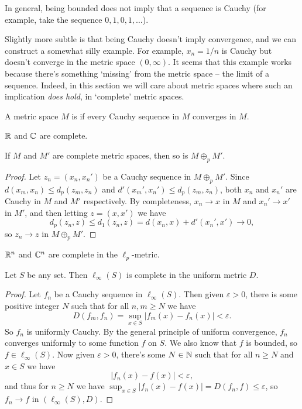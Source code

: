 \documentclass[a4paper]{scrartcl}
\begin{document}
In general, being bounded does not imply that a sequence is Cauchy (for example, take the sequence $0, 1, 0, 1, \dots$).

Slightly more subtle is that being Cauchy doesn't imply convergence, and we can construct a somewhat silly example. For example, $x_n = 1/n$ is Cauchy but doesn't converge in the metric space $(0, \infty)$.
It seems that this example works because there's something `missing' from the metric space -- the limit of a sequence. Indeed, in this section we will care about metric spaces where such an implication \emph{does hold}, in `complete' metric spaces.

\begin{definition}[Completeness]
    A metric space $M$ is  if every Cauchy sequence in $M$ converges in $M$.
\end{definition}

\begin{example}
    $\mathbb{R}$ and $\mathbb{C}$ are complete.
\end{example}

\begin{proposition}
    If $M$ and $M'$ are complete metric spaces, then so is $M \oplus_p M'$.
\end{proposition}
\begin{proof}
    Let $z_n = (x_n, x_n')$ be a Cauchy sequence in $M \oplus_p M'$. Since $d(x_m, x_n) \leq d_p(z_m, z_n)$ and $d'(x_m', x_n') \leq d_p(z_m, z_n)$, both $x_n$ and $x_n'$ are Cauchy in $M$ and $M'$ respectively. By completeness, $x_n \rightarrow x$ in $M$ and $x_n' \rightarrow x'$ in $M'$, and then letting $z = (x, x')$ we have
    $$
    d_p(z_n, z) \leq d_1(z_n, z) = d(x_n, x) + d'(x_n', x') \rightarrow 0,
    $$
    so $z_n \rightarrow z$ in $M \oplus_p M'$.
\end{proof}

\begin{example}
    $\mathbb{R}^n$ and $\mathbb{C}^n$ are complete in the $\ell_p$-metric.
\end{example}


\begin{theorem}
    Let $S$ be any set. Then $\ell_{\infty}(S)$ is complete in the uniform metric $D$.
\end{theorem}
\begin{proof}
    Let $f_n$ be a Cauchy sequence in $\ell_{\infty}(S)$. Then given $\varepsilon> 0$, there is some positive integer $N$ such that for all $n, m \geq N$ we have
    $$
    D(f_m, f_n) = \sup_{x \in S} |f_m(x) - f_n(x)| < \varepsilon.
    $$
    So $f_n$ is uniformly Cauchy. By the general principle of uniform convergence, $f_n$ converges uniformly to some function $f$ on $S$.
    We also know that $f$ is bounded, so $f \in \ell_{\infty}(S)$. 
    Now given $\varepsilon > 0$, there's some $N \in \mathbb{N}$ such that for all $n \geq N$ and $x \in S$ we have
    $$
    |f_n(x) - f(x)| < \varepsilon,
    $$
    and thus for $n \geq N$ we have $\sup_{x \in S} |f_n(x) - f(x)| = D(f_n, f) \leq \varepsilon$, so $f_n \rightarrow f$ in $(\ell_{\infty}(S), D)$.
\end{proof}
\end{document}
